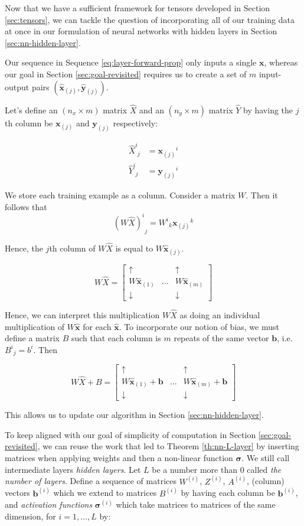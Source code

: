 \documentclass[a4paper]{article}
\theoremstyle{plain} %
\theoremstyle{definition} %
\numberwithin{equation}{subsection}
\newcommand{\vx}{{\textbf{x}}}
\newcommand{\vy}{{\textbf{y}}}
\newcommand{\vb}{{\textbf{b}}}
\newcommand{\vsigma}{{\bm{\sigma}}} %
\newcommand{\vxh}{{\widehat{\textbf{x}}}}
\newcommand{\vyh}{{\widehat{\textbf{y}}}}
\newcommand{\Xh}{{\widehat{X}}}
\newcommand{\Yh}{{\widehat{Y}}}
\begin{document}
Now that we have a sufficient framework for tensors developed in Section \ref{sec:tensors}, we can tackle the question of 
incorporating all of our training data at once in our formulation of neural networks with hidden layers in Section \ref{sec:nn-hidden-layer}.

Our sequence in Sequence \ref{eq:layer-forward-prop} only inputs a single $\vx$, whereas our goal in Section \ref{sec:goal-revisited} requires us 
to create a set of $m$ input-output pairs $(\vxh_{(j)},\vyh_{(j)})$.

Let's define an $(n_x \times m)$ matrix $\Xh$ and an $(n_y \times m)$ matrix $\Yh$ by having the $j$th column be 
$\vx_{(j)}$ and $\vy_{(j)}$ respectively:

\begin{align*}
\Xh^i_{\phantom{i}j} &= {\vx_{(j)}}^i \\ \Yh^i_{\phantom{i}j} &= {\vy_{(j)}}^i 
\end{align*} 

We store each training example as a column. Consider a matrix $W$. Then it follows that 
 \[ {(W \Xh)^i}_j = {W^i}_k {\vx_{(j)}}^k\]

Hence, the $j$th column of $W \Xh$ is equal to $W \vxh_{(j)}$.

\[ W \Xh = \begin{bmatrix}
  \uparrow &  & \uparrow \\
  W\vxh_{(1)} & \dots & W\vxh_{(m)} \\
  \downarrow & & \downarrow
\end{bmatrix}\]

Hence, we can interpret this multiplication $W \Xh$ as doing an individual multiplication of $W \vxh$ for each $\vxh$. 
To incorporate our notion of bias, we must define a matrix $B$ such that each column is $m$ repeats of the same vector $\vb$, 
i.e. $ {B^i}_j = b^i $. 
Then 

\[W \Xh + B = \begin{bmatrix}
  \uparrow &  & \uparrow \\
  W\vxh_{(1)} + \vb & \dots & W\vxh_{(m)} + \vb\\
  \downarrow & & \downarrow
\end{bmatrix}\]


This allows us to update our algorithm in Section \ref{sec:nn-hidden-layer}. 

To keep aligned with our goal of simplicity of computation in Section \ref{sec:goal-revisited}, we can reuse the work 
that led to Theorem \ref{th:nn-L-layer} by inserting matrices when applying weights and then a non-linear function $\vsigma$.
We still call intermediate layers \emph{hidden layers}. Let $L$ be a number more than $0$ called \emph{the number of layers}. 
Define a sequence of matrices $W^{(i)}$, $Z^{(i)} $, $A^{(i)}$, (column) vectors $\vb^{(i)}$ which we extend to matrices $B^{(i)}$ by having each column be $\vb^{(i)}$, and \emph{activation functions} $\vsigma^{(i)}$ which take matrices to matrices of the same dimension, 
for $i = 1, \dots, L$ by:
\end{document}
